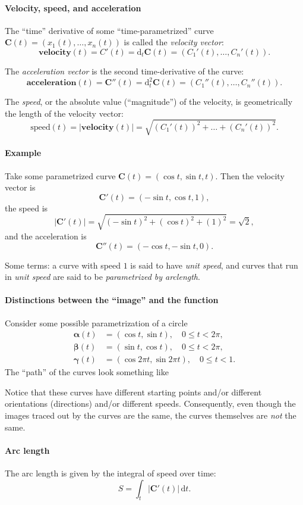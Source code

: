 \documentclass[11pt]{article}
\renewcommand{\vec}[1]{\bm{#1}}
\newcommand{\diff}{\mathrm d}
\begin{document}
\paragraph{Velocity, speed, and acceleration}

The ``time'' derivative of some ``time-parametrized'' curve \(\vec C(t) = (x_1(t), \dots, x_n(t))\) is called the \emph{velocity vector}:
\[
    \mathbf{velocity}(t) = C'(t) = \diff_t \vec C(t) = (C_1'(t), \dots, C_n'(t)).
\]

The \emph{acceleration vector} is the second time-derivative of the curve:
\[
    \mathbf{acceleration}(t) = \vec C''(t) = \diff_t^2 \vec C(t) = (C_1''(t), \dots, C_n''(t)).
\]

The \emph{speed}, or the absolute value (``magnitude'') of the velocity, is geometrically the length of the velocity vector:
\[
    \mathrm{speed}(t) = |\mathbf{velocity}(t)| = \sqrt{(C_1'(t))^2 + \dots + (C_n'(t))^2}.
\]

\paragraph{Example}

Take some parametrized curve \(\vec C(t) = (\cos t, \sin t, t)\). Then the velocity vector is
\[
    \vec C'(t) = (-\sin t, \cos t, 1),
\]
the speed is
\[
    |\vec C'(t)| = \sqrt{(-\sin t)^2 + (\cos t)^2 + (1)^2} = \sqrt{2},
\]
and the acceleration is
\[
    \vec C''(t) = (-\cos t, -\sin t, 0).
\]

Some terms: a curve with speed \(1\) is said to have \emph{unit speed}, and curves that run in \emph{unit speed} are said to be \emph{parametrized by arclength}.

\paragraph{Distinctions between the ``image'' and the function}

Consider some possible parametrization of a circle
\begin{align*}
    \vec \alpha(t) &= (\cos t, \sin t), \quad 0 \le t < 2\pi, \\
    \vec \beta(t) &= (\sin t, \cos t), \quad 0 \le t < 2\pi, \\
    \vec \gamma(t) &= (\cos 2\pi t, \sin 2 \pi t), \quad 0 \le t < 1.
\end{align*}
The ``path'' of the curves look something like
\begin{center}
    
\end{center}
Notice that these curves have different starting points and/or different orientations (directions) and/or different speeds. Consequently, even though the images traced out by the curves are the same, the curves themselves are \emph{not} the same.

\paragraph{Arc length}

The arc length is given by the integral of speed over time:
\[
    S = \int_t |\vec C'(t)| \, \diff t.
\]
\end{document}
